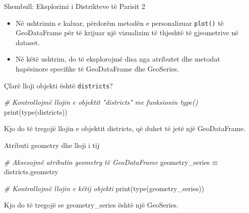 \documentclass[
  ignorenonframetext,
]{beamer}
\newenvironment{Shaded}{\begin{snugshade}}{\end{snugshade}}
\newcommand{\BuiltInTok}[1]{#1}
\newcommand{\CommentTok}[1]{\textcolor[rgb]{0.56,0.35,0.01}{\textit{#1}}}
\newcommand{\NormalTok}[1]{#1}
\newcommand{\OperatorTok}[1]{\textcolor[rgb]{0.81,0.36,0.00}{\textbf{#1}}}
\begin{document}
\begin{frame}[fragile]{Shembull: Eksplorimi i Distrikteve të Parisit 2}
\protect\hypertarget{shembull-eksplorimi-i-distrikteve-tuxeb-parisit-2}{}
\begin{itemize}
\item
  Në ushtrimin e kaluar, përdorëm metodën e personalizuar
  \texttt{plot()} të GeoDataFrame për të krijuar një vizualizim të
  thjeshtë të gjeometrive në dataset.
\item
  Në këtë ushtrim, do të eksplorojmë disa nga atributet dhe metodat
  hapësinore specifike të GeoDataFrame dhe GeoSeries.
\end{itemize}
\end{frame}

\begin{frame}[fragile]{Çfarë lloji objekti është \texttt{districts}?}
\protect\hypertarget{uxe7faruxeb-lloji-objekti-uxebshtuxeb-districts}{}

\begin{Shaded}
\begin{Highlighting}[]
\CommentTok{\# Kontrollojmë llojin e objektit "districts" me funksionin \textasciigrave{}type()\textasciigrave{}}
\BuiltInTok{print}\NormalTok{(}\BuiltInTok{type}\NormalTok{(districts))}
\end{Highlighting}
\end{Shaded}

Kjo do të tregojë llojin e objektit districts, që duhet të jetë një
GeoDataFrame.
\end{frame}

\begin{frame}[fragile]{Atributi geometry dhe lloji i tij}
\protect\hypertarget{atributi-geometry-dhe-lloji-i-tij}{}

\begin{Shaded}
\begin{Highlighting}[]
\CommentTok{\# Aksesojmë atributin \textasciigrave{}geometry\textasciigrave{} të GeoDataFrame}
\NormalTok{geometry\_series }\OperatorTok{=}\NormalTok{ districts.geometry}

\CommentTok{\# Kontrollojmë llojin e këtij objekti}
\BuiltInTok{print}\NormalTok{(}\BuiltInTok{type}\NormalTok{(geometry\_series))}
\end{Highlighting}
\end{Shaded}

Kjo do të tregojë se geometry\_series është një GeoSeries.
\end{frame}
\end{document}
